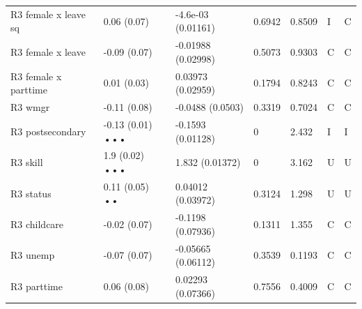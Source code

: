 {\begin{longtable}{@{}p{.245\linewidth}p{.17\linewidth}p{.17\linewidth}p{.085\linewidth}p{.060\linewidth}p{.08\linewidth}p{.07\linewidth}@{}}
R3 female x leave sq & 0.06 (0.07) & -4.6e-03 (0.01161) & 0.6942 & 0.8509 & I & C\\
R3 female x leave & -0.09 (0.07) & -0.01988 (0.02998) & 0.5073 & 0.9303 & C & C\\
R3 female x parttime & 0.01 (0.03) & 0.03973 (0.02959) & 0.1794 & 0.8243 & C & C\\
R3 wmgr & -0.11 (0.08) & -0.0488 (0.0503) & 0.3319 & 0.7024 & C & C\\
R3 postsecondary & -0.13 (0.01) ••• & -0.1593 (0.01128) & 0 & 2.432 & I & I\\
R3 skill & 1.9 (0.02) ••• & 1.832 (0.01372) & 0 & 3.162 & U & U\\
R3 status & 0.11 (0.05) •• & 0.04012 (0.03972) & 0.3124 & 1.298 & U & U\\
R3 childcare & -0.02 (0.07) & -0.1198 (0.07936) & 0.1311 & 1.355 & C & C\\
R3 unemp & -0.07 (0.07) & -0.05665 (0.06112) & 0.3539 & 0.1193 & C & C\\
R3 parttime & 0.06 (0.08) & 0.02293 (0.07366) & 0.7556 & 0.4009 & C & C\\
\end{longtable}}
